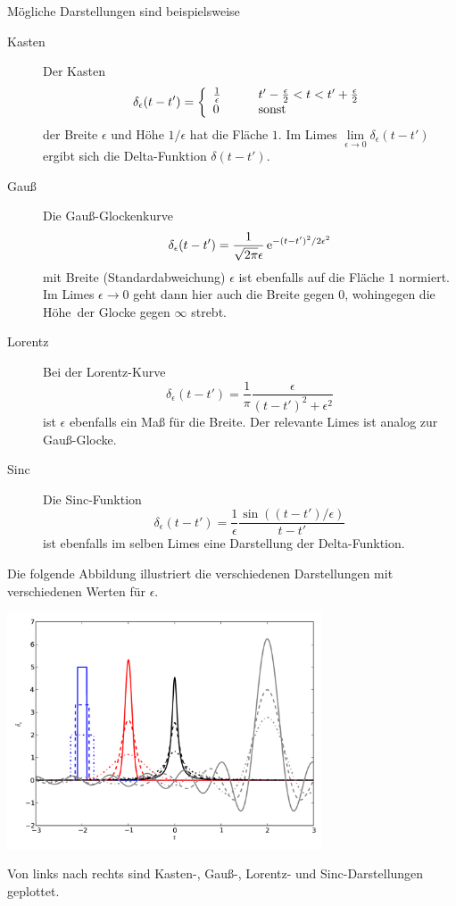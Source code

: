 \documentclass[paper=a4, fontsize=11.0pt, abstractoff, DIV12]{scrartcl}
\begin{document}
Mögliche Darstellungen sind beispielsweise
\begin{description}
    \item[Kasten] Der \glqq Kasten\grqq~
    \begin{equation}
    \delta_\epsilon(t-t') = \left\{\begin{array}{l l}\frac{1}{\epsilon} & \qquad t'-\frac{\epsilon}{2} < t < t'+\frac{\epsilon}{2}\\ 0 &\qquad\mathrm{sonst}\end{array}\right.
    \end{equation}
    der Breite $\epsilon$ und Höhe $1/\epsilon$ hat die Fläche $1$. Im Limes
    $\lim\limits_{\epsilon\to0}\delta_\epsilon(t-t')$ ergibt sich die
    Delta-Funktion $\delta(t-t')$.

    \item[Gauß] Die Gauß-Glockenkurve
    \begin{equation}
    \delta_\epsilon(t-t') = \frac{1}{\sqrt{2\pi}\epsilon} \,{\mathrm{e}}^{-(t-t')^2/2\epsilon^2}
    \end{equation}
    mit Breite (Standardabweichung) $\epsilon$ ist ebenfalls auf die Fläche
    $1$ normiert. Im Limes $\epsilon \to 0$ geht dann hier auch die Breite
    gegen $0$, wohingegen die \glqq Höhe\grqq~der Glocke gegen $\infty$
    strebt.
    \item[Lorentz] Bei der Lorentz-Kurve
    \begin{equation}
    \delta_\epsilon(t-t') = \frac{1}{\pi}\frac{\epsilon}{(t-t')^2 + \epsilon^2}
    \end{equation}
    ist $\epsilon$ ebenfalls ein Maß für die Breite. Der relevante Limes ist
    analog zur Gauß-Glocke.
    \item[Sinc] Die Sinc-Funktion
    \begin{equation}
    \delta_\epsilon(t-t') = \frac{1}{\epsilon} \frac{\sin((t-t')/\epsilon)}{t-t'}
    \end{equation}
    ist ebenfalls im selben Limes eine Darstellung der Delta-Funktion.
\end{description}
    Die folgende Abbildung illustriert die verschiedenen Darstellungen
    mit verschiedenen Werten für $\epsilon$.
    \begin{center}
        \includegraphics[width=0.7\textwidth]{delta-plot.pdf}
    \end{center}
    Von links nach rechts sind Kasten-, Gauß-, Lorentz- und
    Sinc-Darstellungen geplottet.
\end{document}
